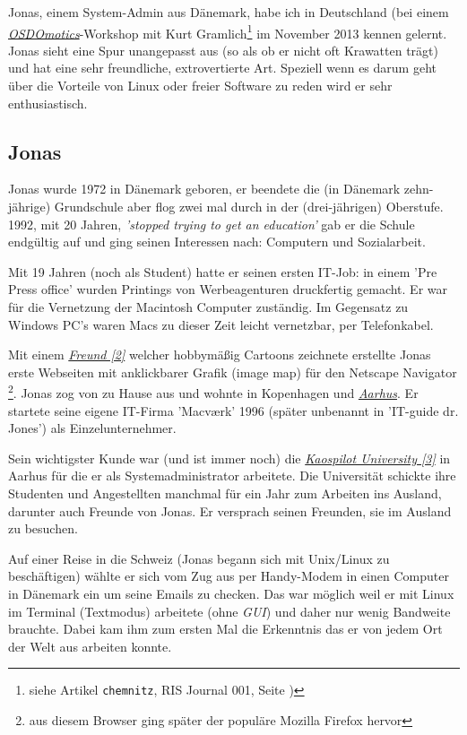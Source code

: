 Jonas, einem System-Admin aus Dänemark, habe ich in Deutschland (bei einem \href{http://osdomotics.com}{\textit{OSDOmotics}}-Workshop mit Kurt Gramlich\footnote{siehe Artikel \texttt{chemnitz}, RIS Journal 001, Seite \pageref{chemnitz})} im November 2013 kennen gelernt. Jonas sieht eine Spur unangepasst aus (so als ob er nicht oft Krawatten trägt) und hat eine sehr freundliche, extrovertierte Art. Speziell wenn es darum geht über die Vorteile von Linux oder freier Software zu reden wird er sehr enthusiastisch. 

\subsection*{Jonas}
Jonas wurde 1972 in Dänemark geboren, er beendete die (in Dänemark zehn-jährige) Grundschule aber flog zwei mal durch in der (drei-jährigen) Oberstufe. 1992, mit 20 Jahren,  \textit{'stopped trying to get an education'} gab er die Schule endgültig auf und ging seinen Interessen nach: Computern und Sozialarbeit.

Mit 19 Jahren (noch als Student) hatte er seinen ersten IT-Job: in einem 'Pre Press office' wurden Printings von Werbeagenturen druckfertig gemacht. Er war für die Vernetzung der Macintosh Computer zuständig. Im Gegensatz zu Windows PC's waren Macs zu dieser Zeit leicht vernetzbar, per Telefonkabel.

Mit einem \href{http://binx.com/}{\textit{Freund [2]}} welcher hobbymäßig Cartoons zeichnete erstellte Jonas erste Webseiten mit anklickbarer Grafik (image map) für den Netscape Navigator \footnote{aus diesem Browser ging später der populäre Mozilla Firefox hervor}. Jonas zog von zu Hause aus und wohnte in Kopenhagen und \href{https://en.wikipedia.org/wiki/Aarhus}{\textit{Aarhus}}. Er startete seine eigene IT-Firma 'Macværk' 1996 (später unbenannt in 'IT-guide dr. Jones') als Einzelunternehmer.

Sein wichtigster Kunde war (und ist immer noch) die \href{http://kaospilot.dk/}{\textit{Kaospilot University [3]}} in Aarhus für die er als Systemadministrator arbeitete. Die Universität schickte ihre Studenten und Angestellten manchmal für ein Jahr zum Arbeiten ins Ausland, darunter auch Freunde von Jonas. Er versprach seinen Freunden, sie im Ausland zu besuchen.

Auf einer Reise in die Schweiz (Jonas begann sich mit Unix/Linux zu beschäftigen) wählte er sich vom Zug aus per Handy-Modem in einen Computer in Dänemark ein um seine Emails zu checken. Das war möglich weil er mit Linux im Terminal (Textmodus) arbeitete (ohne \textit{GUI}) und daher nur wenig Bandweite brauchte. Dabei kam ihm zum ersten Mal die Erkenntnis das er von jedem Ort der Welt aus arbeiten konnte.

